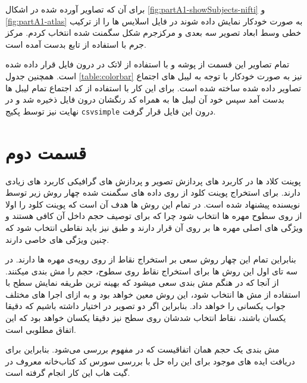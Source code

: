 \begin{note}
برای آن که تصاویر آورده شده در اشکال \ref{fig:partA1-showSubjects-nifti} و \ref{fig:partA1-atlas} به صورت خودکار نمایش داده شوند در فایل  اسلایس ها را از ترکیب خطی وسط ابعاد تصویر سه بعدی و مرکزجرم شکل سگمنت شده انتخاب کردم. مرکز جرم با استفاده از تابع  بدست آمده است.
\end{note}

\begin{note}
تمام تصاویر این قسمت از پوشه 
و با استفاده از لاتک در درون فایل  قرار داده شده است. همچنین جدول \ref{table:colorbar} نیز به صورت خودکار با توجه به لیبل های اجتماع تصاویر داده شده ساخته شده است. برای این کار با استفاده از کد  اجتماع تمام لیبل ها بدست آمد سپس خود آن لیبل ها به همراه کد  رنگشان درون فایل  ذخیره شد و در نهایت نیز توسط پکیج \texttt{csvsimple} درون این فایل قرار گرفت.
\end{note}

\section{قسمت دوم}


پوینت کلاد ها در کاربرد های پردازش تصویر و پردازش های گرافیکی کاربرد های زیادی دارند.
\cite{wiki-Point_cloud}
برای استخراج پوینت کلود از روی داده های سگمنت شده چهار روش زیر توسط نویسنده پیشنهاد شده است. در تمام این روش ها هدف آن است که پوینت کلود را اولا از روی سطوح مهره ها انتخاب شود چرا که برای توصیف حجم داخل آن کافی هستند و ویژگی های اصلی  مهره ها بر روی آن قرار دارند و طبق  \cite{CoherentPointDrift} نیز باید نقاطی انتخاب شود که چنین ویژگی های خاصی دارند.

بنابراین تمام این چهار روش سعی بر استخراج نقاط از روی رویه‌ی مهره ها دارند. در سه تای اول این روش ها برای استخراج نقاط روی سطوح، حجم را مش بندی میکنند. از آنجا که در هنگم مش بندی سعی میشود که بهینه ترین طریقه نمایش سطح با استفاده از مش ها انتخاب شود، این روش معین
خواهد بود و به ازای اجرا های مختلف جواب یکسانی را خواهد داد. بنابراین اگر دو تصویر در اختیار داشته باشیم که دقیقا یکسان باشند، نقاط انتخاب شدشان روی سطح نیز دقیقا یکسان خواهد بود که این اتفاق مطلوبی است. 

\begin{note}
	مش بندی یک حجم همان اتفاقیست که در مفهوم 
\cite{wiki-Boundary_element_method}
بررسی می‌شود. بنابراین برای دریافت ایده های موجود برای این راه حل با بررسی سورس کد کتاب‌خانه معروف  در گیت هاب \cite{fieldtrip-prepare_mesh_segmentation.m} این کار انجام گرفته است.
\end{note}

